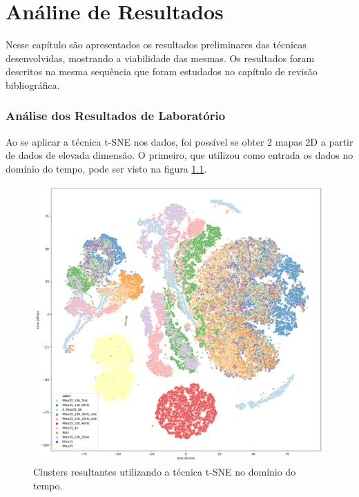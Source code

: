 
\chapter{Análine de Resultados}

Nesse capítulo são apresentados os resultados preliminares das técnicas desenvolvidas, mostrando a viabilidade das mesmas. Os resultados 
foram descritos na mesma sequência que foram estudados no capítulo de revisão bibliográfica.

% 

\subsection{Análise dos Resultados de Laboratório}

Ao se aplicar a técnica t-SNE nos dados, foi possível se obter 2 mapas 2D a partir de dados de elevada dimensão. O primeiro, que
utilizou como entrada os dados no domínio do tempo, pode ser visto na figura \ref{fig:t-sne-1}.

\begin{figure}[H]
    \caption{Clusters resultantes utilizando a técnica t-SNE no domínio do tempo.}
    \begin{center}
        \includegraphics[scale=.25]{resultados/img/t-sne-1.png}
    \end{center}
    \label{fig:t-sne-1}
\end{figure}

